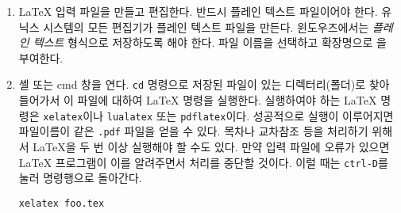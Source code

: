 
\begin{enumerate}

\item \LaTeX{} 입력 파일을 만들고 편집한다. 반드시 플레인 텍스트 파일이어야 한다. 유닉스 시스템의 모든 편집기가 플레인 텍스트 파일을 만든다. 윈도우즈에서는 \emph{플레인 텍스트} 형식으로 저장하도록 해야 한다. 파일 이름을 선택하고 확장명으로 을 부여한다.


\item 셸 또는 cmd 창을 연다. \texttt{cd} 명령으로 저장된 파일이 있는 디렉터리(폴더)로 찾아 들어가서 이 파일에 대하여 \LaTeX{} 명령을 실행한다. 실행하여야 하는 \LaTeX{} 명령은 \texttt{xelatex}이나 \texttt{lualatex} 또는 \texttt{pdflatex}이다.
성공적으로 실행이 이루어지면 파일이름이 같은 \texttt{.pdf} 파일을 얻을 수 있다. 목차나 교차참조 등을 처리하기 위해서 \LaTeX 을 두 번 이상 실행해야 할 수도 있다. 만약 입력 파일에 오류가 있으면 \LaTeX{} 프로그램이 이를 알려주면서 처리를 중단할 것이다. 이럴 때는 \texttt{ctrl-D}를 눌러 명령행으로 돌아간다.
\begin{lscommand}
\verb+xelatex foo.tex+
\end{lscommand}

\end{enumerate}

